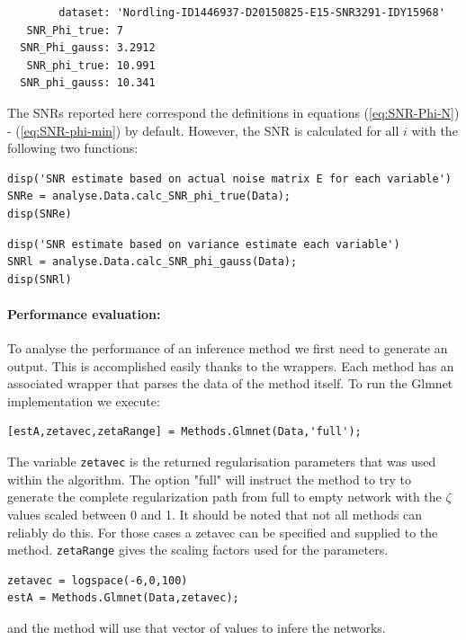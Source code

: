 \begin{bibunit}
\begin{verbatim}
        dataset: 'Nordling-ID1446937-D20150825-E15-SNR3291-IDY15968'
   SNR_Phi_true: 7
  SNR_Phi_gauss: 3.2912
   SNR_phi_true: 10.991
  SNR_phi_gauss: 10.341
\end{verbatim}
The SNRs reported here correspond the definitions in equations
(\ref{eq:SNR-Phi-N}) - (\ref{eq:SNR-phi-min}) by default.
However, the SNR is calculated for all \(i\) with the following two functions:
\begin{verbatim}
disp('SNR estimate based on actual noise matrix E for each variable')
SNRe = analyse.Data.calc_SNR_phi_true(Data);
disp(SNRe)
\end{verbatim}
\begin{verbatim}
disp('SNR estimate based on variance estimate each variable')
SNRl = analyse.Data.calc_SNR_phi_gauss(Data);
disp(SNRl)
\end{verbatim}

\paragraph{Performance evaluation:}
\label{sec:performance_eval}
To analyse the performance of an inference method we first need to generate an output.
This is accomplished easily thanks to the wrappers.
Each method has an associated wrapper that parses the data of the method itself.
To run the Glmnet \lasso implementation we execute:

\begin{verbatim}
[estA,zetavec,zetaRange] = Methods.Glmnet(Data,'full');
\end{verbatim}
The variable \texttt{zetavec} is the returned regularisation parameters that was used within the algorithm. The option "full" will instruct the method to try to generate the complete regularization path from full to empty network with the $\zeta$ values scaled between 0 and 1. It should be noted that not all methods can reliably do this. For those cases a zetavec can be specified and supplied to the method. \texttt{zetaRange} gives the scaling factors used for the parameters.
\begin{verbatim}
zetavec = logspace(-6,0,100)
estA = Methods.Glmnet(Data,zetavec);
\end{verbatim}
and the method will use that vector of values to infere the networks.


\end{bibunit}

